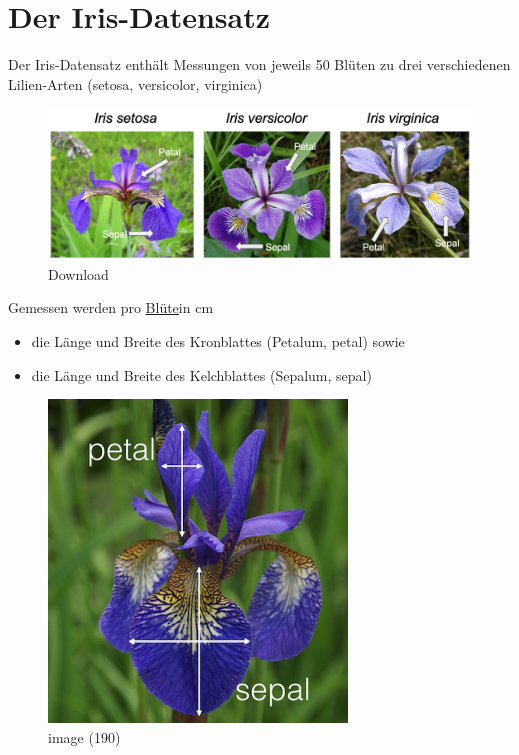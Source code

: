 \documentclass[
  oneside]{book}
\providecommand{\tightlist}{%
  \setlength{\itemsep}{0pt}\setlength{\parskip}{0pt}}
\begin{document}
\hypertarget{der-iris-datensatz}{%
\section{Der Iris-Datensatz}\label{der-iris-datensatz}}

Der Iris-Datensatz enthält Messungen von jeweils 50 Blüten zu drei verschiedenen Lilien-Arten (setosa, versicolor, virginica)

\begin{figure}
\centering
\includegraphics[width=1\textwidth,height=\textheight]{assets/daten.assets/Download.png}
\caption{Download}
\end{figure}

Gemessen werden pro \href{https://de.wikipedia.org/wiki/Bl\%C3\%BCte}{Blüte}in cm 

\begin{itemize}
\tightlist
\item
  die Länge und Breite des Kronblattes (Petalum, petal) sowie 
\item
  die Länge und Breite des Kelchblattes (Sepalum, sepal)
\end{itemize}

\begin{figure}
\centering
\includegraphics{assets/daten.assets/image_messung-16426070933692.png}
\caption{image (190)}
\end{figure}
\end{document}

